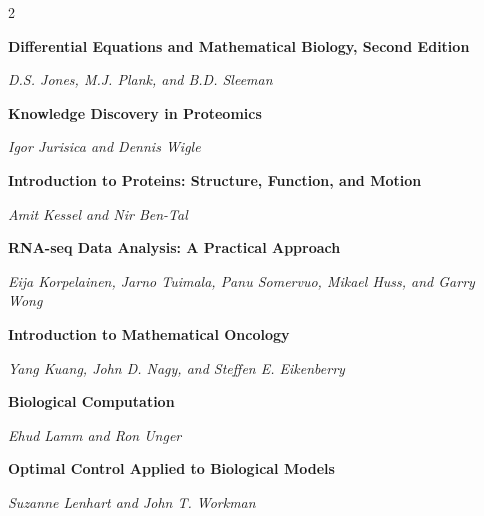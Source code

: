 \begin{multicols}{2}
\par\noindent\begin{minipage}{\linewidth}
\raggedright
\textbf{Differential Equations and Mathematical Biology, Second Edition}\par
\textit{D.S. Jones, M.J. Plank, and B.D. Sleeman}
\end{minipage}\par\medskip
\par\noindent\begin{minipage}{\linewidth}
\raggedright
\textbf{Knowledge Discovery in Proteomics}\par
\textit{Igor Jurisica and Dennis Wigle}
\end{minipage}\par\medskip
\par\noindent\begin{minipage}{\linewidth}
\raggedright
\textbf{Introduction to Proteins: Structure, Function, and Motion}\par
\textit{Amit Kessel and Nir Ben-Tal}
\end{minipage}\par\medskip
\par\noindent\begin{minipage}{\linewidth}
\raggedright
\textbf{RNA-seq Data Analysis: A Practical Approach}\par
\textit{Eija Korpelainen, Jarno Tuimala, Panu Somervuo, Mikael Huss, and Garry Wong}
\end{minipage}\par\medskip
\par\noindent\begin{minipage}{\linewidth}
\raggedright
\textbf{Introduction to Mathematical Oncology}\par
\textit{Yang Kuang, John D. Nagy, and Steffen E. Eikenberry}
\end{minipage}\par\medskip
\par\noindent\begin{minipage}{\linewidth}
\raggedright
\textbf{Biological Computation}\par
\textit{Ehud Lamm and Ron Unger}
\end{minipage}\par\medskip
\par\noindent\begin{minipage}{\linewidth}
\raggedright
\textbf{Optimal Control Applied to Biological Models}\par
\textit{Suzanne Lenhart and John T. Workman}

\end{minipage}
\end{multicols}
